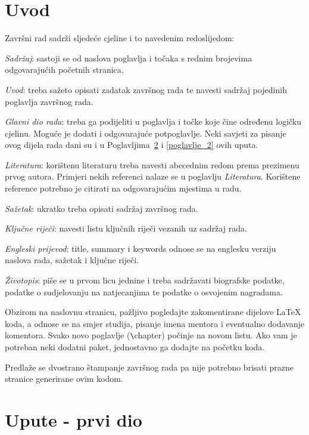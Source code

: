 \documentclass{mathos}
\begin{document}
\tableofcontents
\thispagestyle{empty}



\chapter{Uvod}\label{Uvod}

\noindent
Završni rad sadrži sljedeće cjeline i to navedenim redoslijedom:
\bigskip

{\it Sadržaj}: sastoji se od naslova poglavlja i točaka s rednim brojevima odgovarajućih početnih
stranica.

{\it Uvod}: treba sažeto opisati zadatak završnog rada te navesti sadržaj pojedinih
poglavlja završnog rada.

{\it Glavni dio rada}: treba ga podijeliti u poglavlja i točke koje
čine određenu logičku cjelinu. Moguće je dodati i odgovarajuće potpoglavlje.
Neki savjeti za pisanje ovog dijela rada dani su i u Poglavljima~\ref{poglavlje_1} i \ref{poglavlje_2} ovih uputa.

{\it Literatura}: korištenu literaturu treba navesti abecednim redom prema prezimenu prvog autora.
Primjeri nekih referenci nalaze se u poglavlju {\it Literatura}. Korištene reference potrebno je
citirati na odgovarajućim mjestima u radu.

{\it Sažetak}: ukratko treba opisati sadržaj završnog rada.

{\it Ključne riječi}: navesti listu ključnih riječi vezanih uz sadržaj rada.

{\it Engleski prijevod}: title, summary i keywords odnose se na englesku verziju naslova rada,
sažetak i ključne riječi.

{\it Životopis}: piše se u prvom licu jednine i treba sadržavati biografske podatke,
podatke o sudjelovanju na natjecanjima te podatke o osvojenim nagradama.

\bigskip
\noindent
Obzirom na naslovnu stranicu, pažljivo pogledajte zakomentirane dijelove LaTeX koda, a odnose se na smjer studija, pisanje imena mentora i eventualno dodavanje komentora.
Svako novo poglavlje ({\verb $\$chapter}) počinje na novom listu. Ako vam je potreban neki dodatni paket, jednostavno ga dodajte na početku koda.

\bigskip
\noindent
Predlaže se dvostrano štampanje završnog rada pa nije potrebno brisati prazne stranice generirane ovim kodom.



\chapter{Upute - prvi dio}\label{poglavlje_1}
\end{document}
